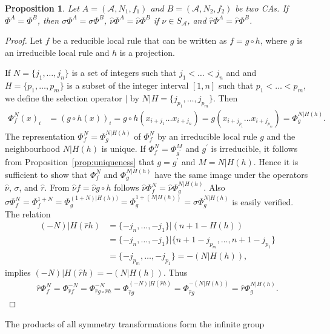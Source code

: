 \documentclass[a4paper]{article}
\newtheorem{prop}{Proposition}
\begin{document}
\begin{prop}
Let $A = (\mathcal{A}, N_1, f_1)$ and $B = (\mathcal{A}, N_2, f_2)$ be two CAs.
If $\Phi^A = \Phi^B$, then
$\sigma \Phi^A = \sigma \Phi^B$, $\hat{\nu} \Phi^A = \hat{\nu} \Phi^B$ if $\nu \in S_\mathcal{A}$,
and $\hat{r} \Phi^A = \hat{r} \Phi^B$.
\end{prop}
\begin{proof}
Let $f$ be a reducible local rule that can be written as $f = g \circ h$, where $g$ is an irreducible
local rule and $h$ is a projection.

If $N = \{j_1, \ldots, j_n\}$ is a set of integers
such that $j_1 < \ldots < j_n$ and
and $H = \{p_1, \ldots, p_m\}$ is a subset of the integer interval $[1,n]$
such that $p_1 < \ldots < p_m$,
we define the selection operator $|$ by
$N | H = \{j_{p_1}, \ldots, j_{p_m}\}$.
Then
\begin{align*}
\Phi^N_f(x)_i & = (g \circ h(x))_i = g \circ h(x_{i+j_1} \ldots x_{i+j_n})
= g(x_{i+j_{p_1}} \ldots x_{i+j_{p_m}}) = \Phi^{N | H(h)}_g.
\end{align*}
The representation $\Phi^N_f = \Phi^{N | H(h)}_g$ of $\Phi^N_f$ by an irreducible local rule $g$
and the neighbourhood $N | H(h)$ is unique.
If $\Phi^N_f = \Phi^M_{g^\prime}$ and $g^\prime$ is irreducible,
it follows from Proposition~\ref{prop:uniqueness} that $g=g^\prime$ and
$M = N | H(h)$.
Hence it is sufficient to show that $\Phi^N_f$ and $\Phi^{N | H(h)}_g$ have the same image under
the operators $\hat{\nu}$, $\sigma$, and $\hat{r}$.
From $\hat{\nu}f = \hat{\nu}g \circ h$ follows
$\hat{\nu} \Phi^N_f = \hat{\nu} \Phi^{N | H(h)}_g$.
Also $\sigma \Phi^N_f = \Phi^{1+N}_f = \Phi^{(1 + N )| H(h))}_g =
\Phi^{1 + (N | H(h))}_g = \sigma \Phi^{N | H(h)}_g$
is easily verified.
The relation
\begin{align*}
(-N) | H(\hat{r}h) & = \{-j_n, \ldots, -j_1 \} | (n+1-H(h)) \\
& = \{-j_n, \ldots, -j_1 \} | \{ n+1-j_{p_m}, \ldots, n+1-j_{p_1} \} \\
& = \{ -j_{p_m}, \ldots, -j_{p_{1}} \} = -(N | H(h)),
\end{align*}
implies $(-N) | H(\hat{r}h) = -(N | H(h))$.
Thus
\begin{align*}
\hat{r}\Phi^N_f = \Phi^{-N}_{\hat{r}f} = \Phi^{-N}_{\hat{r} g \circ \hat{r} h}
= \Phi^{(-N)|H(\hat{r}h)}_{\hat{r}g} = \Phi^{-(N|H(h))}_{\hat{r}g} =
\hat{r} \Phi^{N|H(h)}_g.
\end{align*}
\end{proof}
The products of all symmetry transformations form the infinite group
\end{document}
